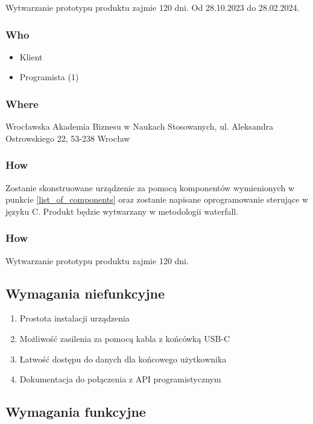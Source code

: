 \documentclass[12pt,a4paper]{article}
\begin{document}
Wytwarzanie prototypu produktu zajmie 120 dni. Od 28.10.2023 do 28.02.2024.

\subsubsection{Who}

\begin{itemize}
    \item Klient
    \item Programista (1)
\end{itemize}

\subsubsection{Where}
Wrocławska Akademia Biznesu w Naukach Stosowanych, ul. Aleksandra Ostrowskiego 22, 53-238 Wrocław

\subsubsection{How}

Zostanie skonstruowane urządzenie za pomocą komponentów wymienionych w punkcie \ref{list_of_components} oraz zostanie napisane 
oprogramowanie sterujące w języku C. Produkt będzie wytwarzany w metodologii waterfall.

\subsubsection{How}

Wytwarzanie prototypu produktu zajmie 120 dni.

\subsection{Wymagania niefunkcyjne}

\begin{enumerate}
    \item Prostota instalacji urządzenia
    \item Możliwość zasilenia za pomocą kabla z końcówką USB-C
    \item Łatwość dostępu do danych dla końcowego użytkownika
    \item Dokumentacja do połączenia z API programistycznym
\end{enumerate}

\subsection{Wymagania funkcyjne}
\end{document}

